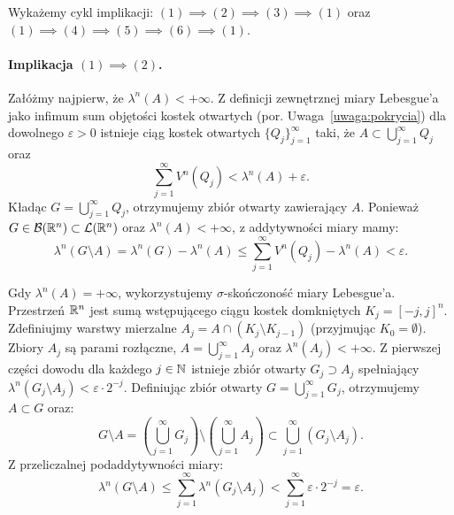 \begin{dow}
    Wykażemy cykl implikacji: $(1) \implies (2) \implies (3) \implies (1)$ oraz $(1) \implies (4) \implies (5) \implies (6) \implies (1)$.

    \paragraph{Implikacja $(1) \implies (2)$.}
    Załóżmy najpierw, że $\lambda^n(A) < +\infty$. Z definicji zewnętrznej miary Lebesgue'a jako infimum sum objętości kostek otwartych (por. Uwaga~\ref{uwaga:pokrycia}) dla dowolnego $\varepsilon > 0$ istnieje ciąg kostek otwartych $\{Q_j\}_{j=1}^\infty$ taki, że $A \subset \bigcup_{j=1}^\infty Q_j$ oraz
    \begin{equation*}
        \sum_{j=1}^\infty V^n(Q_j) < \lambda^n(A) + \varepsilon.
    \end{equation*}
    Kładąc $G = \bigcup_{j=1}^\infty Q_j$, otrzymujemy zbiór otwarty zawierający $A$. Ponieważ $G \in \mathcal{B}({\mathbb{R}^{n}}) \subset \mathcal{L}({\mathbb{R}^{n}})$ oraz $\lambda^n(A) < +\infty$, z addytywności miary mamy:
    \begin{equation*}
        \lambda^n(G \setminus A) = \lambda^n(G) - \lambda^n(A) \le \sum_{j=1}^\infty V^n(Q_j) - \lambda^n(A) < \varepsilon.
    \end{equation*}

    Gdy $\lambda^n(A) = +\infty$, wykorzystujemy $\sigma$-skończoność miary Lebesgue'a. Przestrzeń $\mathbb{R}^{n}$ jest sumą wstępującego ciągu kostek domkniętych $K_j = [-j, j]^n$. Zdefiniujmy warstwy mierzalne $A_j = A \cap (K_j \setminus K_{j-1})$ (przyjmując $K_0 = \emptyset$). Zbiory $A_j$ są parami rozłączne, $A = \bigcup_{j=1}^\infty A_j$ oraz $\lambda^n(A_j) < +\infty$.
    Z pierwszej części dowodu dla każdego $j \in \mathbb{N}$ istnieje zbiór otwarty $G_j \supset A_j$ spełniający $\lambda^n(G_j \setminus A_j) < \varepsilon \cdot 2^{-j}$.
    Definiując zbiór otwarty $G = \bigcup_{j=1}^\infty G_j$, otrzymujemy $A \subset G$ oraz:
    \begin{equation*}
        G \setminus A = \left(\bigcup_{j=1}^\infty G_j\right) \setminus \left(\bigcup_{j=1}^\infty A_j\right) \subset \bigcup_{j=1}^\infty (G_j \setminus A_j).
    \end{equation*}
    Z przeliczalnej podaddytywności miary:
    \begin{equation*}
        \lambda^n(G \setminus A) \le \sum_{j=1}^\infty \lambda^n(G_j \setminus A_j) < \sum_{j=1}^\infty \varepsilon \cdot 2^{-j} = \varepsilon.
    \end{equation*}


\end{dow}
